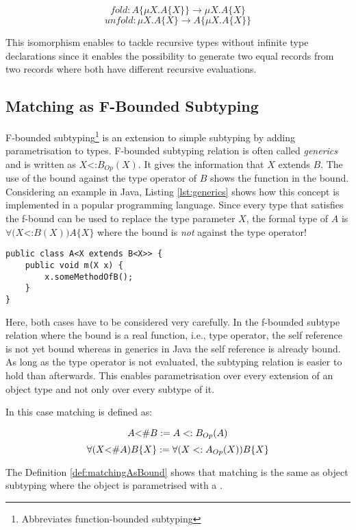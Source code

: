 \begin{defn}
	\label{def:foldUnfold}
	\[fold : A\{\mu X.A\{X\}\} \rightarrow \mu X.A\{X\}\]
	\[unfold : \mu X.A\{X\} \rightarrow A\{\mu X.A\{X\}\}\]
\end{defn}

This isomorphism enables to tackle recursive types without infinite type
declarations since it enables the possibility to generate two equal
records from two records where both have different recursive evaluations.

\subsection{Matching as F-Bounded Subtyping}
F-bounded subtyping\footnote{Abbreviates function-bounded subtyping}
is an extension to simple subtyping by adding parametrisation to
types. F-bounded subtyping relation is often called \emph{generics}
and is written as $X$<:$B_{Op}(X)$. It gives the information that $X$
extends $B$. The use of the bound against the type operator of $B$
shows the function in the bound. Considering an example in Java,
Listing \ref{lst:generics} shows how this concept is implemented in a popular
programming language. Since every type that satisfies the f-bound can
be used to replace the type parameter $X$, the formal type of $A$ is
$\forall(X$<:$B(X))A\{X\}$ where the bound is \emph{not} against the
type operator!

\begin{lstlisting}[float=ht,caption={Universal quantified f-bound in Java.},label={lst:generics}]
public class A<X extends B<X>> {
	public void m(X x) {
		x.someMethodOfB();
	}
}
\end{lstlisting}

Here, both cases have to be considered very carefully. In the f-bounded
subtype relation where the bound is a real function, i.e., type operator,
the self reference is not yet bound whereas in generics in Java the self
reference is already bound. As long as the type operator is not evaluated,
the subtyping relation is easier to hold than afterwards. This enables
parametrisation over every extension of an object type and not only over
every subtype of it.

In this case matching is defined as\cite{abadi_subtyping_1996}:

\begin{defn}
	\label{def:matchingAsBound}
	\[A \textnormal{<\#} B := A <: B_{Op}(A)\]
	\[\forall (X \textnormal{<\#} A)B\{X\} := \forall (X <: A_{Op}(X))B\{X\}\]
\end{defn}

The Definition \ref{def:matchingAsBound} shows that matching is the same
as object subtyping where the object is parametrised with a \mytype.
